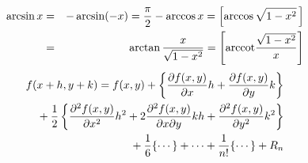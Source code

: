\documentclass{article}
\begin{document}
\begin{eqnarray}
\arcsin x & = & -\arcsin(-x) = \frac{\pi}{2} - \arccos x = 
	       \left[\arccos\sqrt{1-x^2}\,\right]\nonumber\\
	  & = & \arctan\frac{x}{\sqrt{1-x^2}} =
	       \left[\mbox{\rm arccot}\frac{\sqrt{1-x^2}}{x}\right]
\end{eqnarray}
\begin{eqnarray}
\lefteqn{f(x+h,y+k) = f(x,y) + \left\{\frac{\partial f(x,y)}{\partial x}h +
    \frac{\partial f(x,y)}{\partial y}k\right\}}\nonumber\\
    &&\mbox{} + \frac{1}{2}\left\{\frac{\partial^2f(x,y)}{\partial x^2}h^2
      + 2\frac{\partial^2f(x,y)}{\partial x\partial y}kh
      +  \frac{\partial^2f(x,y)}{\partial y^2}k^2\right\}\\
    &&\mbox{} + \frac{1}{6}\{\cdots\} + \cdots + \frac{1}{n!}\{\cdots\} + R_n
    \nonumber
\end{eqnarray}
\end{document}
